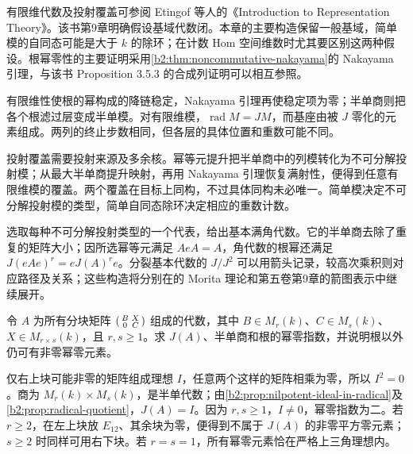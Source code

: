 \ProseParagraphBreak
有限维代数及投射覆盖可参阅 Etingof 等人的《Introduction to Representation Theory》\cite[\S 3.5; \S\S 9.1--9.2]{EtingofEtAl2011RepresentationTheory}。该书第9章明确假设基域代数闭。本章的主要构造保留一般基域，简单模的自同态可能是大于 \(k\) 的除环；在计数 Hom 空间维数时尤其要区别这两种假设。根幂零性的主要证明采用\cref{b2:thm:noncommutative-nakayama}的 Nakayama 引理，与该书 Proposition 3.5.3 的合成列证明可以相互参照。






\begin{chaptersummary}
	有限维性使根的幂构成的降链稳定，Nakayama 引理再使稳定项为零；半单商则把各个根滤过层变成半单模。对有限维模，\(\operatorname{rad}M=JM\)，而基座由被 \(J\) 零化的元素组成。两列的终止步数相同，但各层的具体位置和重数可能不同。

	\ProseParagraphBreak
	投射覆盖需要投射来源及多余核。幂等元提升把半单商中的列模转化为不可分解投射模；从最大半单商提升映射，再用 Nakayama 引理恢复满射性，便得到任意有限维模的覆盖。两个覆盖在目标上同构，不过具体同构未必唯一。简单模决定不可分解投射模的类型，简单自同态除环决定相应的重数计数。

	\ProseParagraphBreak
	选取每种不可分解投射类型的一个代表，给出基本满角代数。它的半单商去除了重复的矩阵大小；因所选幂等元满足 \(AeA=A\)，角代数的根幂还满足 \(J(eAe)^r=eJ(A)^re\)。分裂基本代数的 \(J/J^2\) 可以用箭头记录，较高次乘积则对应路径及关系；这些构造将分别在的 Morita 理论和第五卷第9章的箭图表示中继续展开。
\end{chaptersummary}

\BookExercises

\begin{exercise}\label{b2:ex:15-block-triangular-radical}
	令 \(A\) 为所有分块矩阵 \(\begin{psmallmatrix}B&X\\0&C\end{psmallmatrix}\) 组成的代数，其中 \(B\in M_r(k)\)、\(C\in M_s(k)\)、\(X\in M_{r\times s}(k)\)，且 \(r,s\ge1\)。求 \(J(A)\)、半单商和根的幂零指数，并说明根以外仍可有非零幂零元素。
\end{exercise}
\begin{solution}
	仅右上块可能非零的矩阵组成理想 \(I\)，任意两个这样的矩阵相乘为零，所以 \(I^2=0\)。商为 \(M_r(k)\times M_s(k)\)，是半单代数；由\cref{b2:prop:nilpotent-ideal-in-radical}及\cref{b2:prop:radical-quotient}，\(J(A)=I\)。因为 \(r,s\ge1\)，\(I\ne0\)，幂零指数为二。若 \(r\ge2\)，在左上块放 \(E_{12}\)、其余块为零，便得到不属于 \(J(A)\) 的非零平方零元素；\(s\ge2\) 时同样可用右下块。若 \(r=s=1\)，所有幂零元素恰在严格上三角理想内。
\end{solution}

